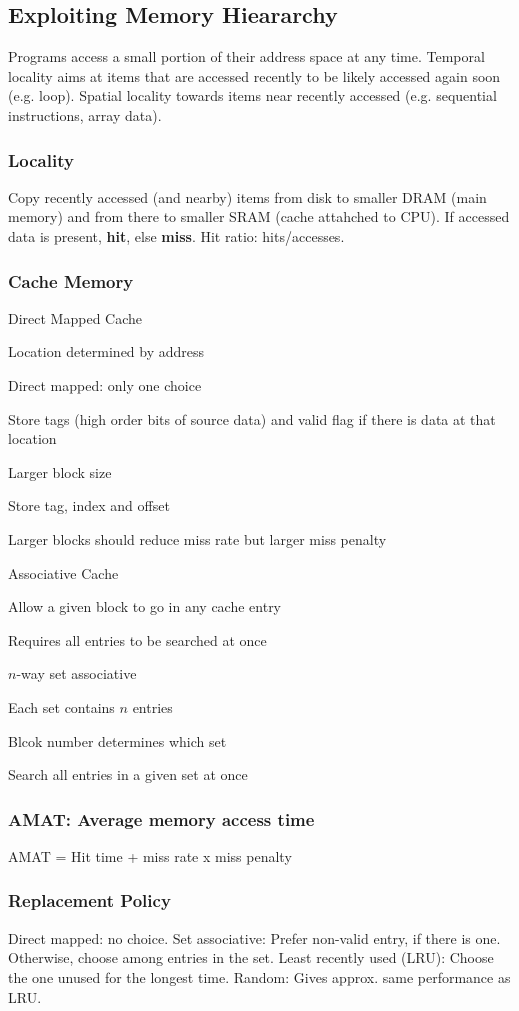\documentclass[a4paper, fontsize=8pt, landscape, DIV=1]{scrartcl}
\makeatletter
\renewenvironment{outline}[1][]{%
  \ifthenelse{\equal{#1}{}}{}{\renewcommand{\ol@type}{#1}}%
  \ol@z%
  \newcommand{\0}{\ol@toz\ol@z}%
  \newcommand{\1}{\vspace{\dimexpr\outlinespacingscalar\baselineskip-\baselineskip}\ol@toi\ol@i\item}%
  \newcommand{\2}{\vspace{\dimexpr\outlinespacingscalartwo\baselineskip-\baselineskip}\ol@toii\ol@ii\item}%
  \newcommand{\3}{\vspace{\dimexpr\outlinespacingscalar\baselineskip-\baselineskip}\ol@toiii\ol@iii\item}%
  \newcommand{\4}{\vspace{\dimexpr\outlinespacingscalar\baselineskip-\baselineskip}\ol@toiiii\ol@iiii\item}%
}{%
  \ol@toz\ol@exit%
}
\def\outlinespacingscalar{0.5}
\def\outlinespacingscalartwo{0.5}
\makeatother
\begin{document}
\begin{multicols*}{4}
  \subsection{Exploiting Memory Hieararchy}
  Programs access a small portion of their address space at any time. Temporal locality aims at items
  that are accessed recently to be likely accessed again soon (e.g. loop). Spatial locality towards
  items near recently accessed (e.g. sequential instructions, array data).

  \subsubsection{Locality}
  Copy recently accessed (and nearby) items from disk to smaller DRAM (main memory) and from there 
  to smaller SRAM (cache attahched to CPU). If accessed data is present, \textbf{hit}, else \textbf{miss}.
  Hit ratio: hits/accesses.

  \subsubsection{Cache Memory}
  \begin{outline}
    \1 Direct Mapped Cache
      \2 Location determined by address
      \2 Direct mapped: only one choice
      \2 Store tags (high order bits of source data) and valid flag if there is data at that location
    \1 Larger block size
      \2 Store tag, index and offset
      \2 Larger blocks should reduce miss rate but larger miss penalty
    \1 Associative Cache
      \2 Allow a given block to go in any cache entry
      \2 Requires all entries to be searched at once
    \1 $n$-way set associative
      \2 Each set contains $n$ entries
      \2 Blcok number determines which set
      \2 Search all entries in a given set at once
  \end{outline}

  \subsubsection{AMAT: Average memory access time}
  AMAT = Hit time + miss rate x miss penalty

  \subsubsection{Replacement Policy}
  Direct mapped: no choice. Set associative: Prefer non-valid entry, if there is one. Otherwise,
  choose among entries in the set. Least recently used (LRU): Choose the one unused for the longest time.
  Random: Gives approx. same performance as LRU.


\end{multicols*}
\end{document}
